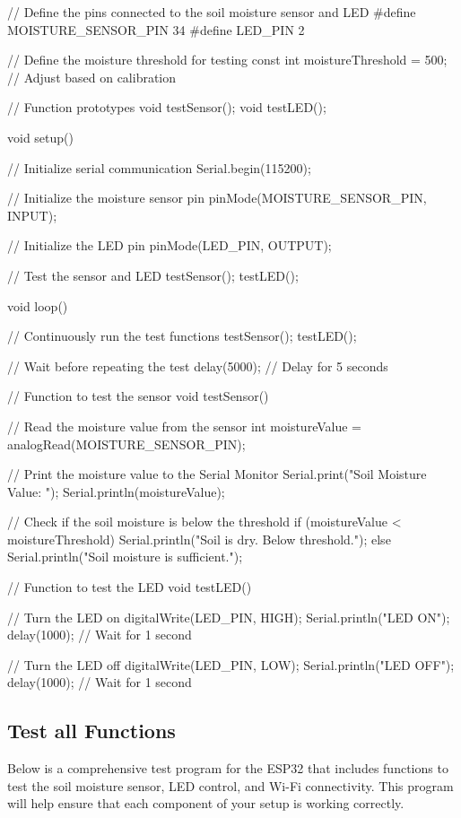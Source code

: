 \begin{Arduino}
	// Define the pins connected to the soil moisture sensor and LED
	#define MOISTURE_SENSOR_PIN 34
	#define LED_PIN 2
	
	// Define the moisture threshold for testing
	const int moistureThreshold = 500; // Adjust based on calibration
	
	// Function prototypes
	void testSensor();
	void testLED();
	
	void setup() {
		// Initialize serial communication
		Serial.begin(115200);
		
		// Initialize the moisture sensor pin
		pinMode(MOISTURE_SENSOR_PIN, INPUT);
		
		// Initialize the LED pin
		pinMode(LED_PIN, OUTPUT);
		
		// Test the sensor and LED
		testSensor();
		testLED();
	}
	
	void loop() {
		// Continuously run the test functions
		testSensor();
		testLED();
		
		// Wait before repeating the test
		delay(5000); // Delay for 5 seconds
	}
	
	// Function to test the sensor
	void testSensor() {
		// Read the moisture value from the sensor
		int moistureValue = analogRead(MOISTURE_SENSOR_PIN);
		
		// Print the moisture value to the Serial Monitor
		Serial.print("Soil Moisture Value: ");
		Serial.println(moistureValue);
		
		// Check if the soil moisture is below the threshold
		if (moistureValue < moistureThreshold) {
			Serial.println("Soil is dry. Below threshold.");
		} else {
			Serial.println("Soil moisture is sufficient.");
		}
	}
	
	// Function to test the LED
	void testLED() {
		// Turn the LED on
		digitalWrite(LED_PIN, HIGH);
		Serial.println("LED ON");
		delay(1000); // Wait for 1 second
		
		// Turn the LED off
		digitalWrite(LED_PIN, LOW);
		Serial.println("LED OFF");
		delay(1000); // Wait for 1 second
	}
	
\end{Arduino}


\subsection{Test all Functions}

Below is a comprehensive test program for the ESP32 that includes functions to test the soil moisture sensor, LED control, and Wi-Fi connectivity. This program will help ensure that each component of your setup is working correctly.

